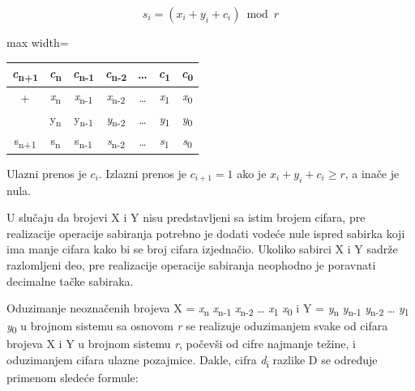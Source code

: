 \documentclass[a4paper,11pt]{article}
\numberwithin{equation}{section}
\newcommand{\redlinija}{\arrayrulecolor{black!28}\specialrule{0.3pt}{2pt}{2pt}\arrayrulecolor{black}}
\begin{document}
\begin{equation}\label{eq:1.1.1}
s_{i} = \left( x_i+y_i+c_i \right)\bmod r
\end{equation}


\begin{center}\begin{adjustbox}{max width=\linewidth}
\begin{tabular}{ccccccc}\toprule
\emph{c}\textsubscript{n+1} & \emph{c}\textsubscript{n} & \emph{c}\textsubscript{n-1} & \emph{c}\textsubscript{n-2} & \ldots{} & \emph{c}\textsubscript{1} & \emph{c}\textsubscript{0} \\
\midrule
+ & \emph{x}\textsubscript{n} & \emph{x}\textsubscript{n-1} & \emph{x}\textsubscript{n-2} & \ldots{} & \emph{x}\textsubscript{1} & \emph{x}\textsubscript{0} \\
\redlinija
 & y\textsubscript{n} & y\textsubscript{n-1} & \emph{y}\textsubscript{n-2} & \ldots{} & \emph{y}\textsubscript{1} & \emph{y}\textsubscript{0} \\
\redlinija
s\textsubscript{n+1} & s\textsubscript{n} & s\textsubscript{n-1} & \emph{s}\textsubscript{n-2} & \ldots{} & \emph{s}\textsubscript{1} & \emph{s}\textsubscript{0} \\
\bottomrule\end{tabular}\end{adjustbox}\end{center}


Ulazni prenos je $c_i$. Izlazni prenos je $c_{i+1}=1$ ako je $x_i+y_i+c_i\ge r$, a inače je nula.

U slučaju da brojevi X i Y nisu predstavljeni sa istim brojem cifara, pre realizacije operacije sabiranja potrebno je dodati vodeće nule ispred sabirka koji ima manje cifara kako bi se broj cifara izjednačio. Ukoliko sabirci X i Y sadrže razlomljeni deo, pre realizacije operacije sabiranja neophodno je poravnati decimalne tačke sabiraka.



Oduzimanje neoznačenih brojeva X = \emph{x}\textsubscript{n} \emph{x}\textsubscript{n-1} \emph{x}\textsubscript{n-2} \ldots{} \emph{x}\textsubscript{1} \emph{x}\textsubscript{0} i Y = \emph{y}\textsubscript{n} \emph{y}\textsubscript{n-1} \emph{y}\textsubscript{n-2} \ldots{} \emph{y}\textsubscript{1} \emph{y}\textsubscript{0} u brojnom sistemu sa osnovom \emph{r} se realizuje oduzimanjem svake od cifara brojeva X i Y u brojnom sistemu \emph{r}, počevši od cifre najmanje težine, i oduzimanjem cifara ulazne pozajmice. Dakle, cifra \emph{d}\textsubscript{i} razlike D se određuje primenom sledeće formule:
\end{document}
